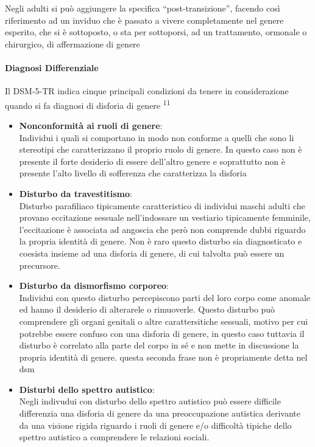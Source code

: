 \documentclass[11pt]{article}
\makeatletter
\newcommand{\cslcitation}[2]
 {\protect\hyper@linkstart{cite}{citeproc_bib_item_#1}#2\hyper@linkend}
\makeatother
\begin{document}
Negli adulti si può aggiungere la specifica ``post-transizione'', facendo così riferimento ad un inviduo che è passato a vivere completamente nel genere esperito, che si è sottoposto, o sta per sottoporsi, ad un trattamento, ormonale o chirurgico, di affermazione di genere
\paragraph{Diagnosi Differenziale}
\label{sec:orgcd93853}
Il DSM-5-TR indica cinque principali condizioni da tenere in considerazione quando si fa diagnosi di disforia di genere \textsuperscript{\cslcitation{11}{11}}

\begin{itemize}
\item \textbf{Nonconformità ai ruoli di genere}: \\
Individui i quali si comportano in modo non conforme a quelli che sono li stereotipi che caratterizzano il proprio ruolo di genere. In questo caso non è presente il forte desiderio di essere dell'altro genere e soprattutto non è presente l'alto livello di sofferenza che caratterizza la disforia

\item \textbf{Disturbo da travestitismo}: \\
Disturbo parafiliaco tipicamente caratteristico di individui maschi adulti che provano eccitazione sessuale nell'indossare un vestiario tipicamente femminile, l'eccitazione è associata ad angoscia che però non comprende dubbi riguardo la propria identità di genere.
Non è raro questo disturbo sia diagnosticato e coesista insieme ad una disforia di genere, di cui talvolta può essere un precursore.

\item \textbf{Disturbo da dismorfismo corporeo}: \\
Individui con questo disturbo percepiscono parti del loro corpo come anomale ed hanno il desiderio di alterarele o rimuoverle.
Questo disturbo può comprendere gli organi genitali o altre carattersitiche sessuali, motivo per cui potrebbe essere confuso con una disforia di genere, in questo caso tuttavia il disturbo è correlato alla parte del corpo in sé e non mette in discussione la propria identità di genere.
 questa seconda frase non è propriamente detta nel dsm
\end{itemize}


\begin{itemize}
\item \textbf{Disturbi dello spettro autistico}: \\
Negli indivudui con disturbo dello spettro autistico può essere difficile differenzia una disforia di genere da una preoccupazione autistica derivante da una visione rigida riguardo i ruoli di genere e/o difficoltà tipiche dello spettro autistico a comprendere le relazioni sociali.
\end{itemize}
\end{document}
